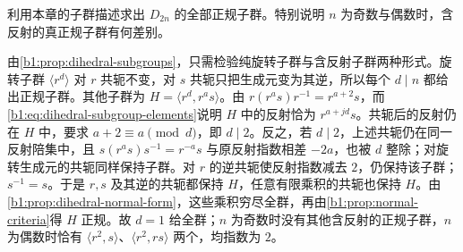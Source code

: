 \begin{exercise}\label{b1:ex:03-dihedral-normal}
	利用本章的子群描述求出 \(D_{2n}\) 的全部正规子群。特别说明 \(n\) 为奇数与偶数时，含反射的真正规子群有何差别。
\end{exercise}
\begin{solution}
	由\cref{b1:prop:dihedral-subgroups}，只需检验纯旋转子群与含反射子群两种形式。旋转子群 \(\langle r^d\rangle\) 对 \(r\) 共轭不变，对 \(s\) 共轭只把生成元变为其逆，所以每个 \(d\mid n\) 都给出正规子群。其他子群为 \(H=\langle r^d,r^as\rangle\)。由 \(r(r^as)r^{-1}=r^{a+2}s\)，而\eqref{b1:eq:dihedral-subgroup-elements}说明 \(H\) 中的反射恰为 \(r^{a+jd}s\)。共轭后的反射仍在 \(H\) 中，要求 \(a+2\equiv a\pmod d\)，即 \(d\mid2\)。反之，若 \(d\mid2\)，上述共轭仍在同一反射陪集中，且 \(s(r^as)s^{-1}=r^{-a}s\) 与原反射指数相差 \(-2a\)，也被 \(d\) 整除；对旋转生成元的共轭同样保持子群。对 \(r\) 的逆共轭使反射指数减去 \(2\)，仍保持该子群；\(s^{-1}=s\)。于是 \(r,s\) 及其逆的共轭都保持 \(H\)，任意有限乘积的共轭也保持 \(H\)。由\cref{b1:prop:dihedral-normal-form}，这些乘积穷尽全群，再由\cref{b1:prop:normal-criteria}得 \(H\) 正规。故 \(d=1\) 给全群；\(n\) 为奇数时没有其他含反射的正规子群，\(n\) 为偶数时恰有 \(\langle r^2,s\rangle\)、\(\langle r^2,rs\rangle\) 两个，均指数为 \(2\)。
\end{solution}


